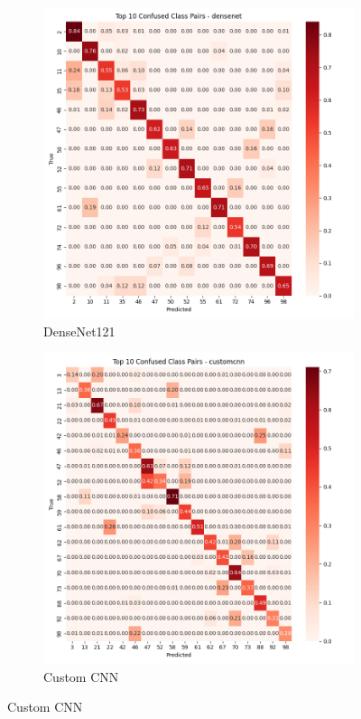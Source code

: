 \documentclass[11pt]{article}
\begin{document}
\begin{figure}[htbp]
\centering
\captionsetup[subfigure]{labelformat=empty}

\begin{subfigure}[b]{0.48\textwidth}
\includegraphics[width=\textwidth]{confusion_matrix_densenet121_top_confused.png}
\caption{DenseNet121}
\end{subfigure}
\hfill
\begin{subfigure}[b]{0.48\textwidth}
\includegraphics[width=\textwidth]{confusion_matrix_customcnn_top_confused.png}
\caption{Custom CNN}
\end{subfigure}


\end{figure}
\end{document}
